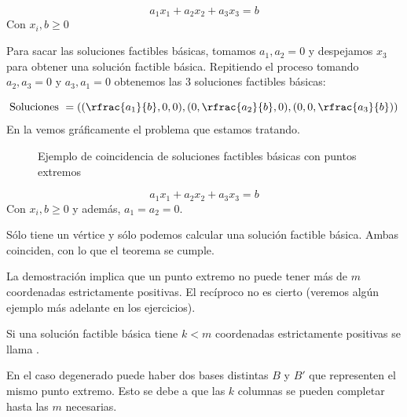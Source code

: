 \begin{example}
\[a_1x_1 + a_2x_2 + a_3x_3 = b\]
Con $x_i,b \geq 0$

Para sacar las soluciones factibles básicas, tomamos $a_1,a_2 = 0$ y despejamos $x_3$ para obtener una solución factible básica. Repitiendo el proceso tomando $a_2,a_3 = 0$ y $a_3,a_1 = 0$ obtenemos las 3 soluciones factibles básicas:

\[
\text{Soluciones } = \left( (\rfrac{a_1}{b},0,0), (0,\rfrac{a_2}{b},0) , (0,0,\rfrac{a_3}{b}) \right)
\]
En la  vemos gráficamente el problema que estamos tratando.

\begin{figure}[h!]
\centering
{}
\caption{Ejemplo de coincidencia de soluciones factibles básicas con puntos extremos}
\label{fig:ejemploTriangulo}
\end{figure}

\end{example}

\begin{example}
\[a_1x_1 + a_2x_2 + a_3x_3 = b\]
Con $x_i,b \geq 0$ y además, $a_1 = a_2 = 0$.

Sólo tiene un vértice y sólo podemos calcular una solución factible básica. Ambas coinciden, con lo que el teorema se cumple.

\end{example}



La demostración implica que un punto extremo  no puede tener más de $m$ coordenadas estrictamente positivas. El recíproco no es cierto (veremos algún ejemplo más adelante en los ejercicios).

Si una solución factible básica tiene $k<m$ coordenadas estrictamente positivas se llama .

En el caso degenerado puede haber dos bases distintas $B$ y $B'$ que representen el mismo punto extremo. Esto se debe a que las $k$ columnas se pueden completar hasta las $m$ necesarias.


